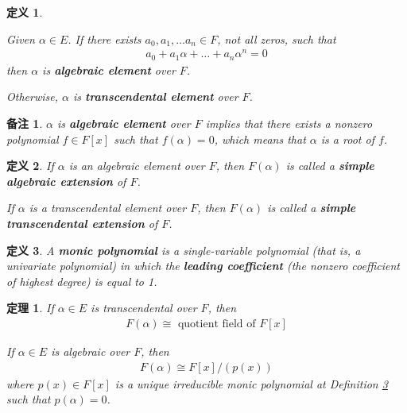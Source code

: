 \documentclass[utf8]{ctexbook}
\newtheorem{theorem}{定理}[section]
\newtheorem{definition}{定义}[section]
\newtheorem{memo}{备注}[section]
\begin{document}
\begin{definition}
\label{def_algebraic_element_transcendental_element}

Given $\alpha \in E$. If there exists $a_0, a_1, \ldots a_n \in F$, not all zeros, such that
\begin{align*}
a_0 + a_1 \alpha + \ldots + a_n \alpha^n = 0 
\end{align*}
then $\alpha$ is \textbf{algebraic element} over $F$.

Otherwise, $\alpha$ is \textbf{transcendental element} over $F$.

\end{definition}

\begin{memo}\label{memo_alt_def_algebraic_element}
$\alpha$ is \textbf{algebraic element} over $F$ implies that there exists a nonzero polynomial $f\in F[x]$ such that $f(\alpha)=0$, which means that $\alpha$ is a root of $f$.
\end{memo}

\begin{definition}
If $\alpha$ is an algebraic element over $F$, then $F(\alpha)$ is called a \textbf{simple algebraic extension} of $F$.

If $\alpha$ is a transcendental element over $F$, then $F(\alpha)$ is called a \textbf{simple transcendental extension} of $F$.
\end{definition}


\begin{definition}\label{def_monic_polynomial}
A \textbf{monic polynomial} is a single-variable polynomial (that is, a univariate polynomial) in which the \textbf{leading coefficient} (the nonzero coefficient of highest degree) is equal to 1.
\end{definition}


\begin{theorem}\label{theorem_4_2_simple_extension_isomorphism}
If $\alpha \in E$ is transcendental over $F$, then
\begin{align*}
F(\alpha) \cong \mbox{ quotient field of } F[x]
\end{align*}

If $\alpha \in E$ is algebraic over $F$, then
\begin{align*}
F(\alpha) \cong F[x] / (p(x))
\end{align*}
where $p(x) \in F[x]$ is a unique irreducible monic polynomial at Definition \ref{def_monic_polynomial} such that $p(\alpha)=0$.
\end{theorem}
\end{document}
